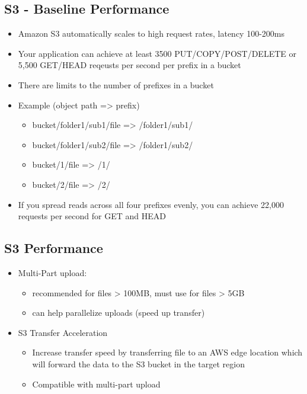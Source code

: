 \subsection{S3 - Baseline Performance}
\begin{itemize}
    \item Amazon S3 automatically scales to high request rates, latency 100-200ms
    \item Your application can achieve at least 3500 PUT/COPY/POST/DELETE or 5,500 GET/HEAD reqeusts per second per prefix in a bucket
    \item There are limits to the number of prefixes in a bucket
    \item Example (object path => prefix)
    \begin{itemize}
        \item bucket/folder1/sub1/file => /folder1/sub1/
        \item bucket/folder1/sub2/file => /folder1/sub2/
        \item bucket/1/file => /1/
        \item bucket/2/file => /2/
    \end{itemize}
    \item If you spread reads across all four prefixes evenly, you can achieve 22,000 requests per second for GET and HEAD
\end{itemize}

\subsection{S3 Performance}
\begin{itemize}
    \item Multi-Part upload:
    \begin{itemize}
        \item recommended for files > 100MB, must use for files > 5GB
        \item can help parallelize uploads (speed up transfer)
    \end{itemize}
    \item S3 Transfer Acceleration
    \begin{itemize}
        \item Increase transfer speed by transferring file to an AWS edge location which will forward the data to the S3 bucket in the target region
        \item Compatible with multi-part upload
    \end{itemize}
\end{itemize}

